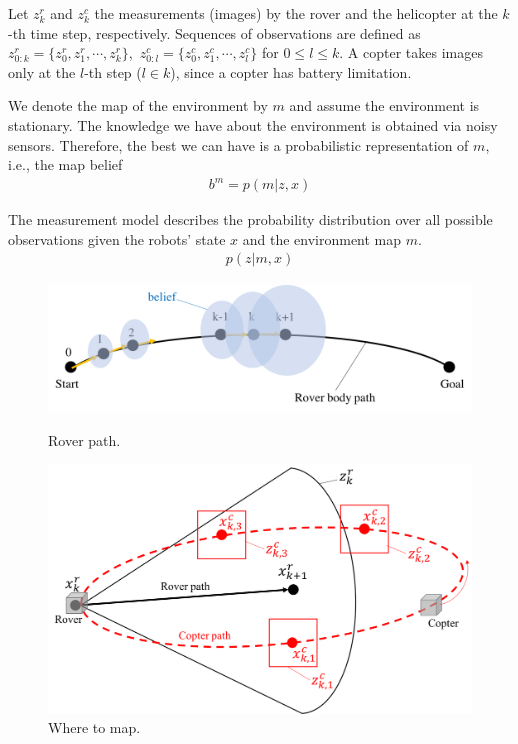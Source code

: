 \documentclass[conference]{IEEEtran}
\begin{document}
Let $z^r_k$ and $z^c_k$ the measurements (images) by the rover and the helicopter at the $k$-th time step, respectively. Sequences of observations are defined as $z^r_{0:k}=\{z^r_0,z^r_1,\cdots,z^r_k\}$,~$z^c_{0:l}=\{z^c_0,z^c_1,\cdots,z^c_l\}$ for $0 \leq l \leq k$. A copter takes images only at the $l$-th step ($l \in k$), since a copter has battery limitation.

We denote the map of the environment by $m$ and assume the environment is stationary. The knowledge we have about the environment is obtained via noisy sensors. Therefore, the best we can have is a probabilistic representation of $m$, i.e., the map belief
\begin{align}
    b^m=p(m|z, x)
\end{align}

The measurement model describes the probability distribution over all possible observations given the robots' state $x$ and the environment map $m$.
\begin{align}
    p(z|m, x)
\end{align}



\begin{figure}[h]
		\centering
		\includegraphics[width=1.0\columnwidth]{figs/8_1.png}
		\caption{Rover path.}
		\label{fig:8_1}
		\centering
		\includegraphics[width=1.0\columnwidth]{figs/8_2.png}
		\caption{Where to map.}
		\label{fig:8_2}
\end{figure}
\end{document}
